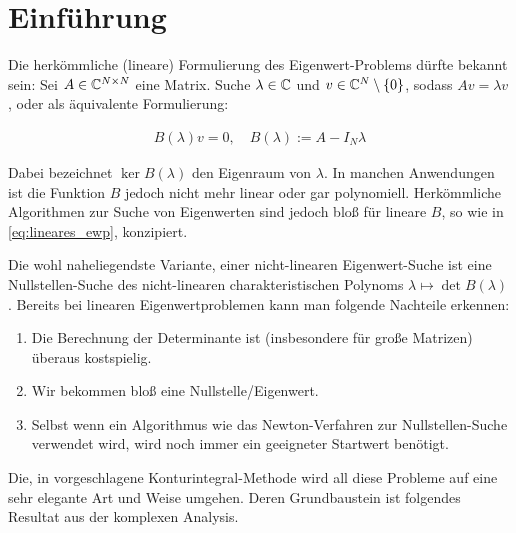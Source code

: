 \section{Einführung}

Die herkömmliche (lineare) Formulierung des Eigenwert-Problems dürfte bekannt sein:
Sei $A \in \mathbb{C}^{N \times N}$ eine Matrix.
Suche $\lambda \in \mathbb{C}$ und $v \in \mathbb{C}^N \setminus {\left \{ 0 \right \}}$, sodass $A v = \lambda v$,
oder als äquivalente Formulierung:

\begin{align} \label{eq:lineares_ewp}
    B(\lambda) v = 0,
    \quad
    B(\lambda) := A - I_N \lambda
\end{align}

Dabei bezeichnet $\ker B(\lambda)$ den Eigenraum von $\lambda$.
In manchen Anwendungen ist die Funktion $B$ jedoch nicht mehr linear oder gar polynomiell.
Herkömmliche Algorithmen zur Suche von Eigenwerten sind jedoch bloß für lineare $B$, so wie in \eqref{eq:lineares_ewp}, konzipiert.

Die wohl naheliegendste Variante, einer nicht-linearen Eigenwert-Suche ist eine Nullstellen-Suche des nicht-linearen charakteristischen Polynoms $\lambda \mapsto \det B(\lambda)$.
Bereits bei linearen Eigenwertproblemen kann man folgende Nachteile erkennen:

\begin{enumerate}[label = \arabic*.]
    \item Die Berechnung der Determinante ist (insbesondere für große Matrizen) überaus kostspielig.
    \item Wir bekommen bloß eine Nullstelle/Eigenwert.
    \item Selbst wenn ein Algorithmus wie das Newton-Verfahren zur Nullstellen-Suche verwendet wird, wird noch immer ein geeigneter Startwert benötigt.
\end{enumerate}

Die, in \cite{BEYN20123839} vorgeschlagene Konturintegral-Methode wird all diese Probleme auf eine sehr elegante Art und Weise umgehen.
Deren Grundbaustein ist folgendes Resultat aus der komplexen Analysis.
